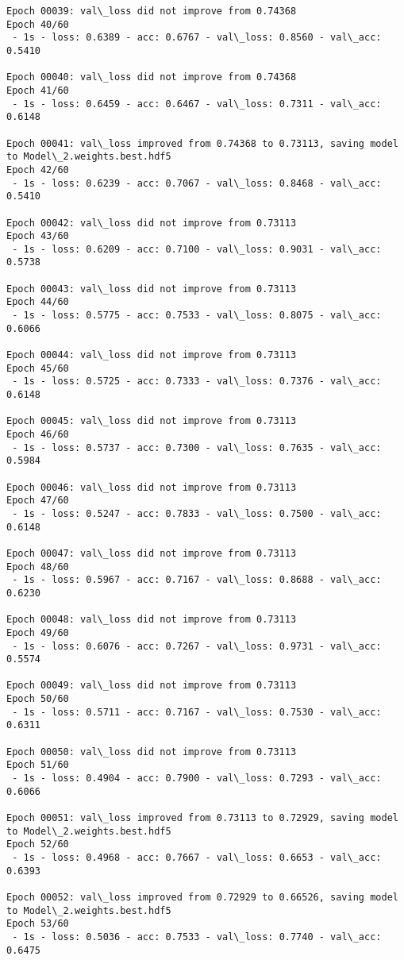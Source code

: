 \documentclass[11pt]{article}
\begin{document}
\begin{Verbatim}[commandchars=\\\{\}]
Epoch 00039: val\_loss did not improve from 0.74368
Epoch 40/60
 - 1s - loss: 0.6389 - acc: 0.6767 - val\_loss: 0.8560 - val\_acc: 0.5410

Epoch 00040: val\_loss did not improve from 0.74368
Epoch 41/60
 - 1s - loss: 0.6459 - acc: 0.6467 - val\_loss: 0.7311 - val\_acc: 0.6148

Epoch 00041: val\_loss improved from 0.74368 to 0.73113, saving model to Model\_2.weights.best.hdf5
Epoch 42/60
 - 1s - loss: 0.6239 - acc: 0.7067 - val\_loss: 0.8468 - val\_acc: 0.5410

Epoch 00042: val\_loss did not improve from 0.73113
Epoch 43/60
 - 1s - loss: 0.6209 - acc: 0.7100 - val\_loss: 0.9031 - val\_acc: 0.5738

Epoch 00043: val\_loss did not improve from 0.73113
Epoch 44/60
 - 1s - loss: 0.5775 - acc: 0.7533 - val\_loss: 0.8075 - val\_acc: 0.6066

Epoch 00044: val\_loss did not improve from 0.73113
Epoch 45/60
 - 1s - loss: 0.5725 - acc: 0.7333 - val\_loss: 0.7376 - val\_acc: 0.6148

Epoch 00045: val\_loss did not improve from 0.73113
Epoch 46/60
 - 1s - loss: 0.5737 - acc: 0.7300 - val\_loss: 0.7635 - val\_acc: 0.5984

Epoch 00046: val\_loss did not improve from 0.73113
Epoch 47/60
 - 1s - loss: 0.5247 - acc: 0.7833 - val\_loss: 0.7500 - val\_acc: 0.6148

Epoch 00047: val\_loss did not improve from 0.73113
Epoch 48/60
 - 1s - loss: 0.5967 - acc: 0.7167 - val\_loss: 0.8688 - val\_acc: 0.6230

Epoch 00048: val\_loss did not improve from 0.73113
Epoch 49/60
 - 1s - loss: 0.6076 - acc: 0.7267 - val\_loss: 0.9731 - val\_acc: 0.5574

Epoch 00049: val\_loss did not improve from 0.73113
Epoch 50/60
 - 1s - loss: 0.5711 - acc: 0.7167 - val\_loss: 0.7530 - val\_acc: 0.6311

Epoch 00050: val\_loss did not improve from 0.73113
Epoch 51/60
 - 1s - loss: 0.4904 - acc: 0.7900 - val\_loss: 0.7293 - val\_acc: 0.6066

Epoch 00051: val\_loss improved from 0.73113 to 0.72929, saving model to Model\_2.weights.best.hdf5
Epoch 52/60
 - 1s - loss: 0.4968 - acc: 0.7667 - val\_loss: 0.6653 - val\_acc: 0.6393

Epoch 00052: val\_loss improved from 0.72929 to 0.66526, saving model to Model\_2.weights.best.hdf5
Epoch 53/60
 - 1s - loss: 0.5036 - acc: 0.7533 - val\_loss: 0.7740 - val\_acc: 0.6475


\end{Verbatim}
\end{document}
